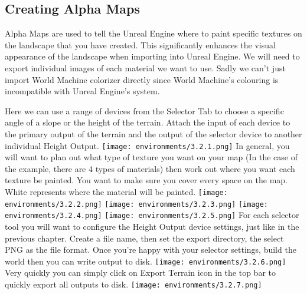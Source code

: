 \documentclass[../main.tex]{subfiles}
\begin{document}
\subsection{Creating Alpha Maps}
Alpha Maps are used to tell the Unreal Engine where to paint specific textures on the landscape that you have created. This significantly enhances the visual appearance of the landscape when importing into Unreal Engine. We will need to export individual images of each material we want to use. Sadly we can’t just import World Machine colorizer directly since World Machine’s colouring is incompatible with Unreal Engine’s system.

Here we can use a range of devices from the Selector Tab to choose a specific angle of a slope or the height of the terrain. Attach the input of each device to the primary output of the terrain and the output of the selector device to another individual Height Output.
\texttt{[image: environments/3.2.1.png]}
In general, you will want to plan out what type of texture you want on your map (In the case of the example, there are 4 types of materials) then work out where you want each texture be painted. You want to make sure you cover every space on the map. White represents where the material will be painted.
\texttt{[image: environments/3.2.2.png]}
\texttt{[image: environments/3.2.3.png]}
\texttt{[image: environments/3.2.4.png]}
\texttt{[image: environments/3.2.5.png]}
For each selector tool you will want to configure the Height Output device settings, just like in the previous chapter.
Create a file name, then set the export directory, the select PNG as the file format.
Once you’re happy with your selector settings, build the world then you can write output to disk.
\texttt{[image: environments/3.2.6.png]}
Very quickly you can simply click on Export Terrain icon  in the top bar to quickly export all outputs to disk.
\texttt{[image: environments/3.2.7.png]}
\end{document}
